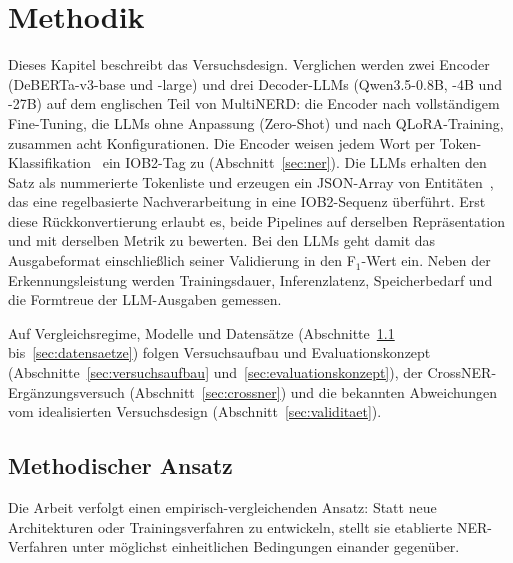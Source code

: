 %

\chapter{Methodik}
\label{chap:methodik}

Dieses Kapitel beschreibt das Versuchsdesign.
Verglichen werden zwei Encoder (DeBERTa-v3-base und -large) und drei
Decoder-LLMs (Qwen3.5-0.8B, -4B und -27B) auf dem englischen Teil von
MultiNERD: die Encoder nach vollständigem Fine-Tuning, die LLMs ohne
Anpassung (Zero-Shot) und nach QLoRA-Training, zusammen acht
Konfigurationen.
Die Encoder weisen jedem Wort per
Token-Klassifikation~\cite{devlin2019bert,he2021debertav3} ein IOB2-Tag
zu (Abschnitt~\ref{sec:ner}).
Die LLMs erhalten den Satz als nummerierte Tokenliste und erzeugen ein
JSON-Array von Entitäten~\cite{dagdelen2024structuredIE,semin2026spanLabeling},
das eine regelbasierte Nachverarbeitung in eine IOB2-Sequenz überführt.
Erst diese Rückkonvertierung erlaubt es, beide Pipelines auf derselben
Repräsentation und mit derselben Metrik zu bewerten. Bei den LLMs geht
damit das Ausgabeformat einschließlich seiner Validierung in den
F$_1$-Wert ein.
Neben der Erkennungsleistung werden Trainingsdauer, Inferenzlatenz,
Speicherbedarf und die Formtreue der LLM-Ausgaben gemessen.

Auf Vergleichsregime, Modelle und Datensätze
(Abschnitte~\ref{sec:methodischer-ansatz} bis~\ref{sec:datensaetze})
folgen Versuchsaufbau und Evaluationskonzept
(Abschnitte~\ref{sec:versuchsaufbau} und~\ref{sec:evaluationskonzept}),
der CrossNER-Ergänzungsversuch (Abschnitt~\ref{sec:crossner}) und die
bekannten Abweichungen vom idealisierten Versuchsdesign
(Abschnitt~\ref{sec:validitaet}).

\section{Methodischer Ansatz}
\label{sec:methodischer-ansatz}

Die Arbeit verfolgt einen empirisch-vergleichenden Ansatz: Statt neue
Architekturen oder Trainingsverfahren zu entwickeln, stellt sie
etablierte NER-Verfahren unter möglichst einheitlichen Bedingungen
einander gegenüber.


